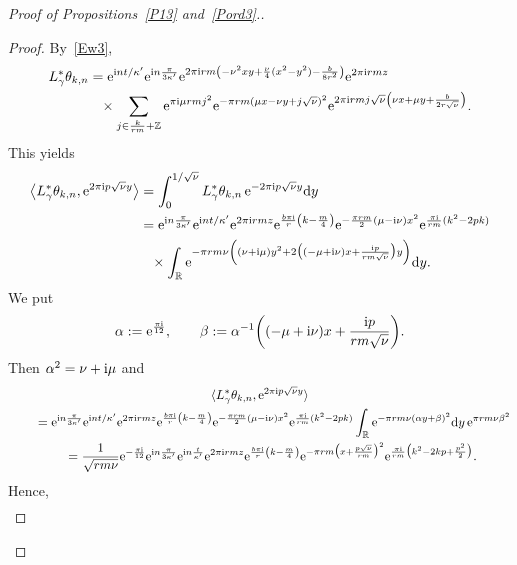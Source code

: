 \documentclass[pdftex]{sigma}
\newcommand\Z{{\mathbb Z}}
\newcommand\R{{\mathbb R}}
\newcommand\la{\langle}
\newcommand\ra{\rangle}
\numberwithin{equation}{section}
\begin{document}
\begin{proof}[Proof of Propositions~\ref{P13} and~\ref{Pord3}.]
\begin{proof}
By~\eqref{Ew3},
\begin{align*}
L^*_{\gamma} \theta_{k,n}&={\rm e}^{{\rm i}nt/\kappa'}{\rm e}^{{\rm i}n\frac{\pi}{3\kappa'}}{\rm e}^{2\pi {\rm i}rm\left(-\nu^2xy+\frac\nu4(x^2-y^2)-\frac b{8r^2}\right)}{\rm e}^{2\pi {\rm i}rmz}
\\
&\phantom{=}\times \sum_{j\in \frac k{rm}+\Z}{\rm e}^{\pi {\rm i} \mu rmj^2}{\rm e}^{-\pi rm(\mu x-\nu y+j\sqrt\nu)^2}{\rm e}^{2\pi {\rm i} rmj\sqrt\nu \left(\nu x+\mu y+\frac b{2r{\sqrt\nu}}\right)}.
\end{align*}
This yields
\begin{align*}
\big\la L^*_{\gamma} \theta_{k,n}, {\rm e}^{2\pi {\rm i}p\sqrt\nu y}\big\ra &= \int_0^{1/\sqrt\nu}L^*_{\gamma} \theta_{k,n} \, {\rm e}^{-2\pi {\rm i}p\sqrt\nu y}{\rm d}y
\\
&={\rm e}^{{\rm i}n\frac{\pi}{3\kappa'}}{\rm e}^{{\rm i}nt/\kappa'}{\rm e}^{2\pi {\rm i}rmz} {\rm e}^{\frac{b\pi {\rm i}}r\left(k-\frac m4\right)} {\rm e}^{-\frac{\pi rm}2\left(\mu-{\rm i}\nu\right)x^2} {\rm e}^{\frac{\pi {\rm i}}{rm}(k^2-2pk)}
\\
&\phantom{=}\times\int_{\R}{\rm e}^{-\pi rm\nu\left((\nu+{\rm i}\mu)y^2+2\big((-\mu+{\rm i}\nu)x+\frac{{\rm i}p}{rm\sqrt\nu}\big)y\right)}{\rm d}y.
\end{align*}
We put
\begin{gather*}
\alpha:={\rm e}^{\frac{\pi {\rm i}}{12}},\qquad
\beta:=\alpha^{-1}\bigg((-\mu+{\rm i}\nu)x+\frac{{\rm i}p}{rm\sqrt\nu}\bigg).
\end{gather*}
Then $\alpha^2=\nu +{\rm i}\mu$ and
\begin{gather*}
\la L^*_{\gamma} \theta_{k,n}, {\rm e}^{2\pi {\rm i}p\sqrt\nu y}\ra
\\ \qquad
{}= {\rm e}^{{\rm i}n\frac{\pi}{3\kappa'}}{\rm e}^{{\rm i}nt/\kappa'}{\rm e}^{2\pi {\rm i}rmz} {\rm e}^{\frac{b\pi {\rm i}}r\left(k-\frac m4\right)} {\rm e}^{-\frac{\pi rm}2\left(\mu-{\rm i}\nu\right)x^2} {\rm e}^{\frac{\pi {\rm i}}{rm}(k^2-2pk)}
\int_{\R}{\rm e}^{-\pi rm\nu (\alpha y+\beta)^2}{\rm d}y \, {\rm e}^{\pi rm\nu\beta^2}
\\ \qquad
= \frac1{\sqrt{rm\nu}} {\rm e}^{-\frac{\pi {\rm i}}{12}} {\rm e}^{{\rm i}n\frac{\pi}{3\kappa'}}{\rm e}^{{\rm i}n\frac t{\kappa'}}{\rm e}^{2\pi {\rm i}rmz} {\rm e}^{\frac{b\pi {\rm i}}r\left(k-\frac m4\right)} {\rm e}^{-\pi rm\big(x+\frac{p\sqrt\nu}{rm}\big)^2}{\rm e}^{\frac{\pi {\rm i}}{rm}\big(k^2-2kp+\frac{p^2}2\big)}.
\end{gather*}
Hence,
\begin{align*}

\end{align*}
\end{proof}
\end{proof}
\end{document}
